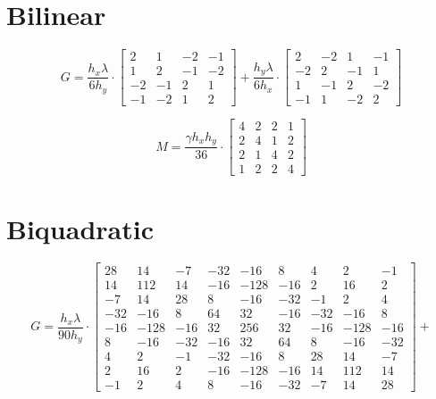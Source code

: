 \documentclass[preview]{standalone}
\begin{document}
\section{Bilinear}

$$
G = \frac{h_{x} \lambda}{6 h_{y}}\cdot\left[\begin{matrix}2 & 1 & -2 & -1\\1 & 2 & -1 & -2\\-2 & -1 & 2 & 1\\-1 & -2 & 1 & 2\end{matrix}\right] + \frac{h_{y} \lambda}{6 h_{x}}\cdot\left[\begin{matrix}2 & -2 & 1 & -1\\-2 & 2 & -1 & 1\\1 & -1 & 2 & -2\\-1 & 1 & -2 & 2\end{matrix}\right]
$$

$$
M = \frac{\gamma h_{x} h_{y}}{36}\cdot\left[\begin{matrix}4 & 2 & 2 & 1\\2 & 4 & 1 & 2\\2 & 1 & 4 & 2\\1 & 2 & 2 & 4\end{matrix}\right]
$$

\section{Biquadratic}

$$
G = \frac{h_{x} \lambda}{90 h_{y}}\cdot\left[\begin{matrix}28 & 14 & -7 & -32 & -16 & 8 & 4 & 2 & -1\\14 & 112 & 14 & -16 & -128 & -16 & 2 & 16 & 2\\-7 & 14 & 28 & 8 & -16 & -32 & -1 & 2 & 4\\-32 & -16 & 8 & 64 & 32 & -16 & -32 & -16 & 8\\-16 & -128 & -16 & 32 & 256 & 32 & -16 & -128 & -16\\8 & -16 & -32 & -16 & 32 & 64 & 8 & -16 & -32\\4 & 2 & -1 & -32 & -16 & 8 & 28 & 14 & -7\\2 & 16 & 2 & -16 & -128 & -16 & 14 & 112 & 14\\-1 & 2 & 4 & 8 & -16 & -32 & -7 & 14 & 28\end{matrix}\right] +
$$
\end{document}

